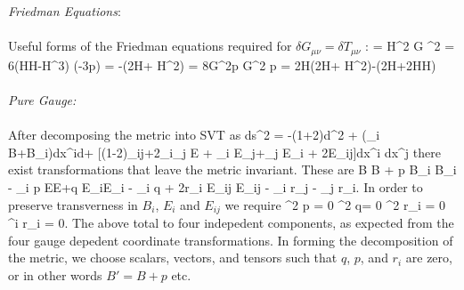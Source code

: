 \documentclass[10pt,letterpaper]{article}
\newcommand{\hu}{\mathcal H}
\begin{document}
\ee
\\ \\
\emph{Friedman Equations}:\\ \\
Useful forms of the Friedman equations required for $\delta G_{\mu\nu} = \delta T_{\mu\nu}$ :
\be
	\rho{} = \hu^2
\ee
{}\pi G \Omega^2 \dot\rho = 6(\dot \hu \hu -\hu^3)
\ee
\be
	 (\rho-3p) = \frac{\ddot \Omega}{\Omega}
\ee
\be
	-(2\dot\hu + \hu^2) = 8\pi G\Omega^2p
\ee
{}\pi G\Omega^2 \dot p = 2\hu (2\dot\hu + \hu^2)-(2\ddot\hu+2\hu\dot\hu)
\ee
\\ \\
\emph{Pure Gauge:}\\ \\ After decomposing the metric into SVT as
\be
	ds^2 = -(1+2\phi)d\tau^2 + (\pd_i B+B_i)dx^id\tau + [(1-2\psi)\delta_{ij}+2\pd_i\pd_j E + \pd_i E_j+\pd_j E_i + 2E_{ij}]dx^i dx^j
\ee
there exist transformations that leave the metric invariant. These are
\be
	B \to B + p
\ee
\be
	B_i \to B_i - \del_i p
\ee
\be
	E\to E+q
\ee
\be
	E_i\to E_i - \del_i q + 2r_i
\ee
\be
	E_{ij} \to E_{ij} - \del_i r_j - \del_j r_i.
\ee
In order to preserve transverness in $B_i$, $E_i$ and $E_{ij}$ we require
\be
	\del^2 p = 0
\ee
\be
	\del^2 q= 0
\ee
\be
	\del^2 r_i = 0
\ee
\be
	\del^i r_i = 0.
\ee
The above total to four indepedent components, as expected from the four gauge depedent coordinate transformations. In forming the decomposition of the metric, we choose scalars, vectors, and tensors such that $q$, $p$, and $r_i$ are zero, or in other words $B' = B+p$ etc. 
\end{document}
